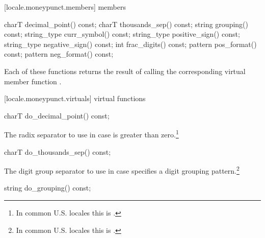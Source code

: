 [locale.moneypunct.members]{ members}

%
%
%
%
%
%
%
%
%
\begin{codeblock}
charT        decimal_point() const;
charT        thousands_sep() const;
string       grouping()      const;
string_type  curr_symbol()   const;
string_type  positive_sign() const;
string_type  negative_sign() const;
int          frac_digits()   const;
pattern      pos_format()    const;
pattern      neg_format()    const;
\end{codeblock}

\pnum
Each of these functions 
returns the result of calling the corresponding
virtual member function
.

[locale.moneypunct.virtuals]{ virtual functions}

%
\begin{itemdecl}
charT do_decimal_point() const;
\end{itemdecl}

\begin{itemdescr}
\pnum
\returns
The radix separator to use in case
is greater than zero.\footnote{In common U.S. locales this is
.}
\end{itemdescr}

%
\begin{itemdecl}
charT do_thousands_sep() const;
\end{itemdecl}

\begin{itemdescr}
\pnum
\returns
The digit group separator to use in case
specifies a digit grouping pattern.\footnote{In common U.S. locales this is
.}
\end{itemdescr}

%
\begin{itemdecl}
string do_grouping() const;
\end{itemdecl}


